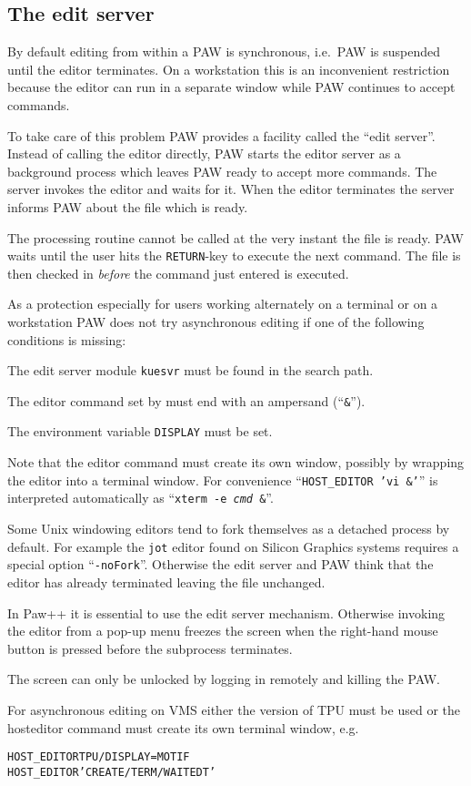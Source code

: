 \subsection{The edit server}\label{sec-edit-server}

By default editing from within a PAW is synchronous,
i.e.\ PAW is suspended until the editor terminates.
On a workstation this is an inconvenient restriction because the
editor can run in a separate window while PAW continues to
accept commands.

To take care of this problem PAW provides a facility called the
``edit server''.
Instead of calling the editor directly, PAW starts the editor
server as a background process which leaves PAW
ready to accept more commands.
The server invokes the editor and waits for it.
When the editor terminates the server informs PAW
about the file which is ready.

The processing routine cannot be called at the very instant the file
is ready.
PAW waits until the user hits the \texttt{RETURN}-key to execute the
next command.
The file is then checked in \emph{before} the command just entered is
executed.

As a protection especially for users working alternately on a terminal
or on a workstation PAW does not try asynchronous editing if one
of the following conditions is missing:
\begin{UL}
\item The edit server module \texttt{kuesvr} must be found in the search
path.
\item The editor command set by  must end with an
ampersand (``\texttt{\&}''). 
\item The environment variable \texttt{DISPLAY} must be set.
\end{UL}

Note that the editor command must create its own window, possibly by
wrapping the editor into a terminal window.
For convenience ``\texttt{HOST\_EDITOR 'vi \&'}'' is interpreted
automatically as ``\texttt{xterm -e \textsl{cmd} \&}''.

Some Unix windowing editors tend to fork themselves as a detached process
by default.
For example the \texttt{jot} editor found on Silicon Graphics systems
requires a special option ``\texttt{-noFork}''.
Otherwise the edit server and PAW think that the editor
has already terminated leaving the file unchanged.

In Paw++ it is essential to use the edit server
mechanism.
Otherwise invoking the editor from a pop-up menu freezes the screen
when the right-hand mouse button is pressed before the subprocess
terminates.

The screen can only be unlocked by logging in remotely and killing the
PAW.

For asynchronous editing on VMS either the \Motif{} version of TPU
must be used or the hosteditor command must create its own terminal
window, e.g.\ 
\begin{alltt}
HOST_EDITOR TPU/DISPLAY=MOTIF
HOST_EDITOR 'CREATE/TERM/WAIT EDT'
\end{alltt}
